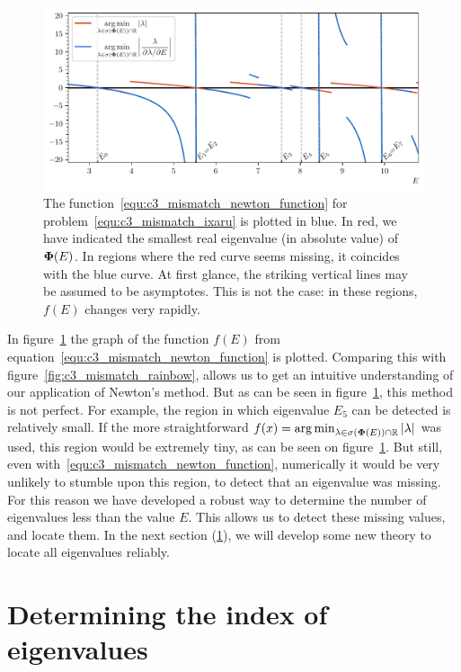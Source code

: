 \begin{figure}
  \centering
  \includegraphics[width=\textwidth]{img/chapter3/mismatch_newton.pdf}
  \caption{The function~\eqref{equ:c3_mismatch_newton_function} for problem~\eqref{equ:c3_mismatch_ixaru} is plotted in blue. In red, we have indicated the smallest real eigenvalue (in absolute value) of $\vb{\Phi}(E)$. In regions where the red curve seems missing, it coincides with the blue curve. At first glance, the striking vertical lines may be assumed to be asymptotes. This is not the case: in these regions, $f(E)$ changes very rapidly.}\label{fig:c3_mismatch_newton}
\end{figure}

In figure~\ref{fig:c3_mismatch_newton} the graph of the function $f(E)$ from equation~\eqref{equ:c3_mismatch_newton_function} is plotted. Comparing this with figure~\ref{fig:c3_mismatch_rainbow}, allows us to get an intuitive understanding of our application of Newton's method. But as can be seen in figure~\ref{fig:c3_mismatch_newton}, this method is not perfect. For example, the region in which eigenvalue $E_5$ can be detected is relatively small. If the more straightforward $f(x) = \operatorname*{arg\,min}_{\lambda \in \operatorname{\sigma}(\vb{\Phi}(E)) \cap \mathbb{R}} \left|\lambda\right|$ was used, this region would be extremely tiny, as can be seen on figure~\ref{fig:c3_mismatch_newton}. But still, even with~\eqref{equ:c3_mismatch_newton_function}, numerically it would be very unlikely to stumble upon this region, to detect that an eigenvalue was missing. For this reason we have developed a robust way to determine the number of eigenvalues less than the value $E$. This allows us to detect these missing values, and locate them. In the next section (\ref{sec:c3_index_of_e}), we will develop some new theory to locate all eigenvalues reliably.

\section{Determining the index of eigenvalues}\label{sec:c3_index_of_e}

